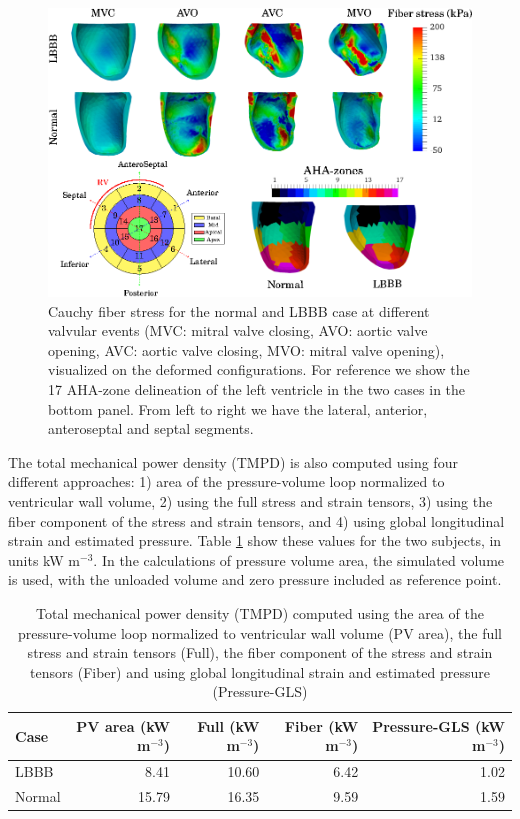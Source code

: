 \begin{figure}[htbp]
  \centering
  \includegraphics{figures/snap_shots}
  \caption{\label{fig:snap_shots}Cauchy fiber stress for the normal and LBBB case at
    different valvular events (MVC: mitral valve closing, AVO: aortic
    valve opening, AVC: aortic valve closing, MVO: mitral valve
    opening), visualized on the deformed configurations. For reference
    we show the 17 AHA-zone delineation of the left ventricle in the
    two cases in the bottom panel. From left to right we have the
    lateral, anterior, anteroseptal and septal segments. }
\end{figure}




The total mechanical power density (TMPD) is also computed using four
different approaches: 1) area of the pressure-volume loop normalized
to ventricular wall volume, 2) using the full stress and strain tensors,
3) using the fiber component of the stress and strain tensors, and 4)
using global longitudinal strain and estimated pressure. Table
\ref{tab:total_mechanical_power} show these values for the two
subjects, in units kW m$^{-3}$. In the calculations of pressure volume
area, the simulated volume is used, with the unloaded volume and zero
pressure included as reference point.

\begin{table}
\caption{Total mechanical power density (TMPD) computed using the area
  of the pressure-volume loop normalized to ventricular wall volume
  (PV area), the full stress and strain tensors (Full), the fiber
  component of the stress and strain tensors (Fiber) and using global
  longitudinal strain and estimated pressure (Pressure-GLS)} 
\begin{tabular}{lrrrr}
\hline
 Case   &   PV area (kW m$^{-3}$) &   Full (kW m$^{-3}$) &   Fiber (kW m$^{-3}$) &   Pressure-GLS (kW m$^{-3}$) \\
\hline
 LBBB   &                    8.41 &                10.60 &                  6.42 &                         1.02 \\
 Normal &                   15.79 &                16.35 &                  9.59 &                         1.59 \\
\hline
\end{tabular}
\label{tab:total_mechanical_power}
\end{table}


